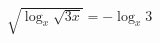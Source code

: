 \begin{ex}[type=equation]
	\begin{condition}
		$\sqrt{\log_x \sqrt{3x}} = -\log_x 3$
	\end{condition}
\end{ex}